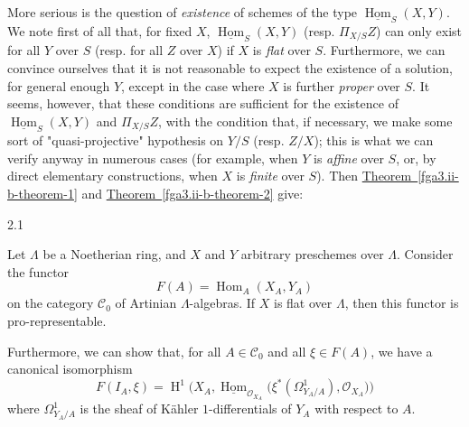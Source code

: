   More serious is the question of \emph{existence} of schemes of the type \(\underline {\operatorname {Hom}}_S(X,Y)\).
  We note first of all that, for fixed \(X\), \(\underline {\operatorname {Hom}}_S(X,Y)\) (resp. \(\Pi _{X/S}Z\)) can only exist for all \(Y\) over \(S\) (resp. for all \(Z\) over \(X\)) if \(X\) is \emph{flat} over \(S\).
  Furthermore, we can convince ourselves that it is not reasonable to expect the existence of a solution, for general enough \(Y\), except in the case where \(X\) is further \emph{proper} over \(S\).
  It seems, however, that these conditions are sufficient for the existence of \(\underline {\operatorname {Hom}}_S(X,Y)\) and \(\Pi _{X/S}Z\), with the condition that, if necessary, we make some sort of "quasi-projective" hypothesis on \(Y/S\) (resp. \(Z/X\));
  this is what we can verify anyway in numerous cases (for example, when \(Y\) is \emph{affine} over \(S\), or, by direct elementary constructions, when \(X\) is \emph{finite} over \(S\)).
  Then \hyperref[fga3.ii-b-theorem-1]{Theorem~\ref*{fga3.ii-b-theorem-1}} and \hyperref[fga3.ii-b-theorem-2]{Theorem~\ref*{fga3.ii-b-theorem-2}} give:\begin{proposition}{2.1}\label{fga3.ii-c.2-proposition-2.1}\skipsinglepar\par{}Let \(\Lambda \) be a Noetherian ring, and \(X\) and \(Y\) arbitrary preschemes over \(\Lambda \).
    Consider the functor
    \[       F(A)       = \operatorname {Hom}_A(X_A,Y_A)     \]
    on the category \(\mathcal {C}_0\) of Artinian \(\Lambda \)-algebras.
    If \(X\) is flat over \(\Lambda \), then this functor is pro-representable.\end{proposition}\par{}Furthermore, we can show that, for all \(A\in \mathcal {C}_0\) and all \(\xi \in  F(A)\), we have a canonical isomorphism
  \[     F(I_A,\xi )     = \operatorname {H}^1\Big (X_A,\underline {\operatorname {Hom}}_{\mathscr {O}_{X_A}}\big (\xi ^*(\Omega _{Y_A/A}^1),\mathscr {O}_{X_A}\big )\Big )   \]
  where \(\Omega _{Y_A/A}^1\) is the sheaf of Kähler \(1\)-differentials of \(Y_A\) with respect to \(A\).
